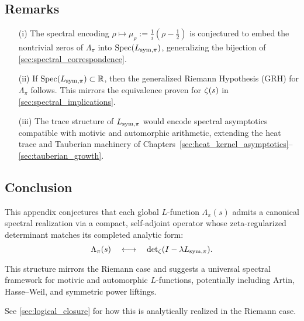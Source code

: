 \subsection*{Remarks}
\begin{itemize}
  \item[(i)] The spectral encoding \( \rho \mapsto \mu_\rho := \frac{1}{i}(\rho - \tfrac{1}{2}) \) is conjectured to embed the nontrivial zeros of \( \Lambda_\pi \) into \( \operatorname{Spec}(L_{\mathrm{sym},\pi}) \), generalizing the bijection of \cref{sec:spectral_correspondence}.

  \item[(ii)] If \( \operatorname{Spec}(L_{\mathrm{sym},\pi}) \subset \mathbb{R} \), then the generalized Riemann Hypothesis (GRH) for \( \Lambda_\pi \) follows. This mirrors the equivalence proven for \( \zeta(s) \) in \cref{sec:spectral_implications}.

  \item[(iii)] The trace structure of \( L_{\mathrm{sym},\pi} \) would encode spectral asymptotics compatible with motivic and automorphic arithmetic, extending the heat trace and Tauberian machinery of Chapters~\ref{sec:heat_kernel_asymptotics}–\ref{sec:tauberian_growth}.
\end{itemize}

\subsection*{Conclusion}

This appendix conjectures that each global \( L \)-function \( \Lambda_\pi(s) \) admits a canonical spectral realization via a compact, self-adjoint operator whose zeta-regularized determinant matches its completed analytic form:
\[
\Lambda_\pi(s) \quad \longleftrightarrow \quad \det\nolimits_\zeta(I - \lambda L_{\mathrm{sym},\pi}).
\]

This structure mirrors the Riemann case and suggests a universal spectral framework for motivic and automorphic \( L \)-functions, potentially including Artin, Hasse–Weil, and symmetric power liftings.

\medskip
\noindent
See \cref{sec:logical_closure} for how this is analytically realized in the Riemann case.
